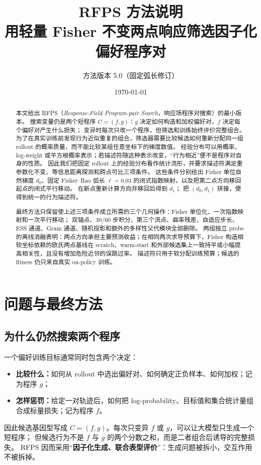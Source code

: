 \documentclass[UTF8,11pt]{ctexart}
\title{\textbf{RFPS 方法说明}\\[0.35em]
\large 用轻量 Fisher 不变两点响应筛选因子化偏好程序对}
\author{方法版本 5.0（固定弧长修订）}
\date{\today}
\newcommand{\RFPS}{\textsc{RFPS}}
\begin{document}
\maketitle

\begin{abstract}
本文给出 \RFPS{}（\emph{Response-Field Program-pair Search}，响应场程序对搜索）的最小版本。
搜索变量仍是两个短程序 $C=(f,g)$：$g$ 决定如何构造和加权偏好对，$f$ 决定每个偏好对产生什么损失；
变异时每次只改一个程序，但筛选和训练始终评价完整组合。
为了在真实训练前发现行为近似重复的组合，筛选器需要比较候选如何重新分配同一组 rollout 的概率质量，而不能比较某组任意坐标下的梯度数值。
经验分布可以用概率、log-weight 或平方根概率表示；若描述符随这种表示改变，“行为相近”便不是程序对自身的性质。
因此我们把固定 rollout 上的经验分布看作统计流形，并要求描述符满足重参数化不变、等信息距离探测和跨点可比三项条件。
这些条件分别给出 Fisher 单位自然梯度 $d_0$、固定 Fisher--Rao 弧长 $\ell=0.03$ 的闭式指数映射，以及把第二点方向移回起点的闭式平行移动。
在新点重新计算方向并移回后得到 $d_1$；
把 $(d_0,d_1)$ 拼接，便得到统一的行为描述符。

最终方法只保留使上述三项条件成立所需的三个几何操作：Fisher 单位化、一次指数映射和一次平行移动；
双锚点、30/60 步积分、第三个流点、曲率残差、自适应步长、ESS 通道、Gram 通道、随机投影和额外的多样性父代模块全部删除。
两组独立 probe 的离线消融表明：两点方向承担主要预测收益；在相同两次求导预算下，Fisher 构造相较坐标依赖的欧氏两点基线在 scratch、warm-start 和外部候选集上一致持平或小幅提高相关性，且没有增加危险近邻的误跳过率。
描述符只用于软分配训练预算；候选的 fitness 仍只来自真实 on-policy 训练。
\end{abstract}

\tableofcontents

\section{问题与最终方法}

\subsection{为什么仍然搜索两个程序}

一个偏好训练目标通常同时包含两个决定：
\begin{itemize}
  \item \textbf{比较什么：}如何从 rollout 中选出偏好对、如何确定正负样本、如何加权；记为程序 $g$；
  \item \textbf{怎样惩罚：}给定一对轨迹后，如何把 log-probability、目标值和集合统计量组合成标量损失；记为程序 $f$。
\end{itemize}
因此候选基因型写成 $C=(f,g)$。每次只变异 $f$ 或 $g$，可以让大模型只生成一个短程序；
但候选行为不是 $f$ 与 $g$ 的两个分数之和，而是二者组合后诱导的完整损失。
\RFPS{} 因而采用“\textbf{因子化生成、联合表型评价}”：生成问题被拆小，交互作用不被拆掉。
\end{document}
